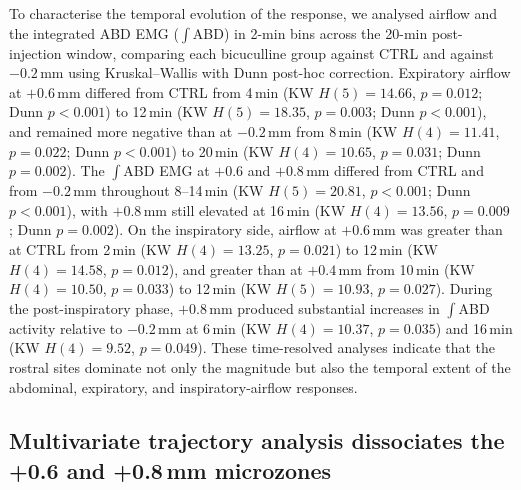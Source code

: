 \documentclass[11pt]{article}
\begin{document}
To characterise the temporal evolution of the response, we analysed
airflow and the integrated ABD EMG ($\int$ABD) in 2-min bins across the
20-min post-injection window, comparing each bicuculline group against
CTRL and against $-0.2$\,mm using Kruskal--Wallis with Dunn post-hoc
correction. Expiratory airflow at $+0.6$\,mm differed from CTRL from
4\,min (KW $H(5)=14.66$, $p=0.012$; Dunn $p<0.001$) to 12\,min
(KW $H(5)=18.35$, $p=0.003$; Dunn $p<0.001$), and remained more negative
than at $-0.2$\,mm from 8\,min (KW $H(4)=11.41$, $p=0.022$; Dunn
$p<0.001$) to 20\,min (KW $H(4)=10.65$, $p=0.031$; Dunn $p=0.002$). The
$\int$ABD EMG at $+0.6$ and $+0.8$\,mm differed from CTRL and from
$-0.2$\,mm throughout 8--14\,min (KW $H(5)=20.81$, $p<0.001$; Dunn
$p<0.001$), with $+0.8$\,mm still elevated at 16\,min (KW $H(4)=13.56$,
$p=0.009$; Dunn $p=0.002$). On the inspiratory side, airflow at
$+0.6$\,mm was greater than at CTRL from 2\,min (KW $H(4)=13.25$,
$p=0.021$) to 12\,min (KW $H(4)=14.58$, $p=0.012$), and greater than at
$+0.4$\,mm from 10\,min (KW $H(4)=10.50$, $p=0.033$) to 12\,min (KW
$H(5)=10.93$, $p=0.027$). During the post-inspiratory phase, $+0.8$\,mm
produced substantial increases in $\int$ABD activity relative to
$-0.2$\,mm at 6\,min (KW $H(4)=10.37$, $p=0.035$) and 16\,min
(KW $H(4)=9.52$, $p=0.049$). These time-resolved analyses indicate that
the rostral sites dominate not only the magnitude but also the temporal
extent of the abdominal, expiratory, and inspiratory-airflow responses.

\subsection{Multivariate trajectory analysis dissociates the +0.6 and +0.8\,mm
microzones}
\end{document}

